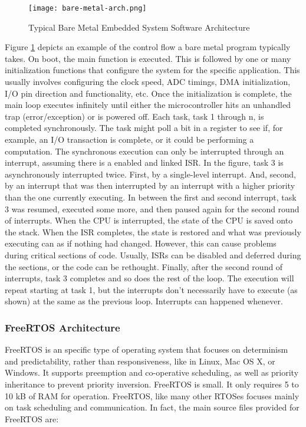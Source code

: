 \begin{figure}[h]
\centering
\texttt{[image: bare-metal-arch.png]}
\caption{Typical Bare Metal Embedded System Software Architecture}
\label{fig:bare-metal-arch}
\end{figure}

Figure \ref{fig:bare-metal-arch} depicts an example of the control flow a bare
metal program typically takes. On boot, the main function is executed. This is
followed by one or many initialization functions that configure the system for
the specific application. This usually involves configuring the clock speed, ADC
timings, DMA initialization, I/O pin direction and functionality, etc. Once the
initialization is complete, the main loop executes infinitely until either the
microcontroller hits an unhandled trap (error/exception) or is powered off. Each
task, task 1 through n, is completed synchronously. The task might poll a bit in
a register to see if, for example, an I/O transaction is complete, or it could
be performing a computation. The synchronous execution can only be interrupted
through an interrupt, assuming there is a enabled and linked ISR. In the figure,
task 3 is asynchronously interrupted twice. First, by a single-level interrupt.
And, second, by an interrupt that was then interrupted by an interrupt with a
higher priority than the one currently executing. In between the first and
second interrupt, task 3 was resumed, executed some more, and then paused again
for the second round of interrupts. When the CPU is interrupted, the state of
the CPU is saved onto the stack. When the ISR completes, the state is restored
and what was previously executing can as if nothing had changed.  However, this
can cause problems during critical sections of code. Usually, ISRs can be
disabled and deferred during the sections, or the code can be rethought.
Finally, after the second round of interrupts, task 3 completes and so does the
rest of the loop. The execution will repeat starting at task 1, but the
interrupts don't necessarily have to execute (as shown) at the same as the
previous loop. Interrupts can happened whenever.


\subsubsection{FreeRTOS Architecture}
FreeRTOS is an specific type of operating system that focuses on determinism and
predictability, rather than responsiveness, like in Linux, Mac OS X, or Windows.
It supports preemption and co-operative scheduling, as well as priority
inheritance to prevent priority inversion. FreeRTOS is small. It only requires 5
to 10 kB of RAM for operation. FreeRTOS, like many other RTOSes focuses mainly
on task scheduling and communication. In fact, the main source files provided
for FreeRTOS are:

